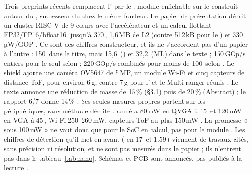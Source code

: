 Trois preprints récents remplacent l' par le , module enfichable sur le
 construit autour du , successeur du  chez le même fondeur. Le papier de
présentation \citep{arxiv-2407.13706-gap9shield-150gops-ai-capable-ultra}\pp{} décrit un
cluster RISC-V de 9 cœurs avec l'accélérateur  et un calcul flottant FP32/FP16/bfloat16,
jusqu'à 370\,, 1,6\,MB de L2 (contre 512\,kB pour le ) et 330\,µW/GOP
. Ce sont des chiffres constructeur, et ils ne s'accordent pas d'un papier à
l'autre : 150\, dans le titre, mais 15,6\, () et 32,2\, (ML) dans le texte
 ; 150\,GOp/s entiers pour le seul  selon
\citet[§III-B]{arxiv-2603.01850-tiny-dronerf-tiny-neural-radiance}\pp{} ; 220\,GOp/s
combinés pour moins de 100\, selon
\citet[§IV-A]{arxiv-2603.02936-self-supervised-domain-adaptation-visual}\pp. Le shield
ajoute une caméra OV5647 de 5\,MP, un module Wi-Fi et cinq capteurs de distance ToF, pour
environ 6\,g, contre 7\,g pour l' et le Multi-ranger réunis . Le texte
annonce une réduction de masse de 15\,\% (§3.1) puis de 20\,\% (Abstract) ; le rapport
6/7 donne 14\,\% \deduit. Ses seules mesures propres portent sur les périphériques, sans
méthode décrite : caméra 80\,mW en QVGA à 15\, et 120\,mW en VGA à 45\,, Wi-Fi
250--260\,mW, capteurs ToF au plus 150\,mW . La promesse « sous 100\,mW » ne vaut
donc que pour le SoC en calcul, pas pour le module \deduit. Les chiffres de détection
qu'il met en avant ( en 17\, et 1,59\,) viennent de travaux cités, sans précision
ni résolution, et ne sont pas mesurés dans le papier  ; ils n'entrent pas dans
le tableau~\ref{tab:nano}. Schémas et PCB sont annoncés, pas publiés à la lecture
.

